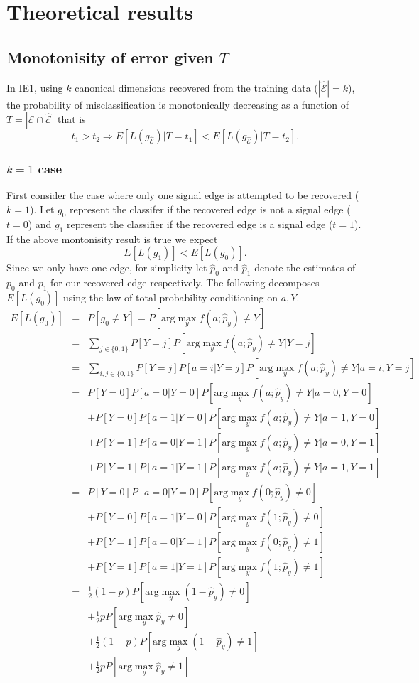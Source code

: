 \documentclass{article}
\begin{document}
\section{Theoretical results}
\subsection{Monotonisity of error given $T$}
In IE1, using $k$ canonical dimensions recovered from the training data ($|\hat{\mathcal{E}}|=k$), the probability of misclassification is monotonically decreasing as a function of $T=|\mathcal{E}\cap\hat{\mathcal{E}}|$ that is
\[
t_1>t_2 \Rightarrow E[L(g_{ \hat{\mathcal{E}} })| T=t_1] < E[L(g_{ \hat{\mathcal{E}} })| T=t_2].
\]

\subsubsection{$k=1$ case}
First consider the case where only one signal edge is attempted to be recovered ($k=1$). Let $g_0$ represent the classifer if the recovered edge is not a signal edge ($t=0$) and $g_1$ represent the classifier if the recovered edge is a signal edge ($t=1$). If the above montonisity result is true we expect
\[
E[L(g_1)] < E[L(g_0)].
\]
Since we only have one edge, for simplicity let $\hat{p}_0$ and $\hat{p}_1$ denote the estimates of $p_0$ and $p_1$ for our recovered edge respectively. The following decomposes $E[L(g_0)]$ using the law of total probability conditioning on $a, Y$.
\begin{eqnarray}
E[L(g_0)] &=& P[g_0 \neq Y] 
 = P[ \textrm{arg} \max_y f(a ; \hat{p}_y ) \neq Y]
\\ &=& \sum_{j \in \{0,1\}}P[Y=j] P[\textrm{arg} \max_y f(a ; \hat{p}_y ) \neq Y|Y=j]
\\ &=& \sum_{i, j \in \{0,1\}}P[Y=j] P[a=i| Y=j] P[\textrm{arg} \max_y f(a ; \hat{p}_y ) \neq Y|a=i, Y=j]
\\ &=& P[Y=0] P[a=0| Y=0] P[\textrm{arg} \max_y f(a ; \hat{p}_y ) \neq Y|a=0, Y=0]
\\&& + P[Y=0] P[a=1| Y=0] P[\textrm{arg} \max_y f(a ; \hat{p}_y ) \neq Y|a=1, Y=0]
\\&& + P[Y=1] P[a=0| Y=1] P[\textrm{arg} \max_y f(a ; \hat{p}_y ) \neq Y|a=0, Y=1]
\\&& + P[Y=1] P[a=1| Y=1] P[\textrm{arg} \max_y f(a ; \hat{p}_y ) \neq Y|a=1, Y=1]
\\
 &=& P[Y=0] P[a=0| Y=0] P[\textrm{arg} \max_y f(0 ; \hat{p}_y ) \neq 0]
\\&& + P[Y=0] P[a=1| Y=0] P[\textrm{arg} \max_y f(1 ; \hat{p}_y ) \neq 0]
\\&& + P[Y=1] P[a=0| Y=1] P[\textrm{arg} \max_y f(0 ; \hat{p}_y ) \neq 1]
\\&& + P[Y=1] P[a=1| Y=1] P[\textrm{arg} \max_y f(1 ; \hat{p}_y ) \neq 1]
\\
 &=& \frac{1}{2} (1-p) P[\textrm{arg} \max_y (1-\hat{p}_y) \neq 0]
\\&& + \frac{1}{2} p P[\textrm{arg} \max_y \hat{p}_y \neq 0]
\\&& + \frac{1}{2} (1-p) P[\textrm{arg} \max_y (1-\hat{p}_y) \neq 1]
\\&& + \frac{1}{2} p P[\textrm{arg} \max_y \hat{p}_y  \neq 1]
\end{eqnarray}
\end{document}
